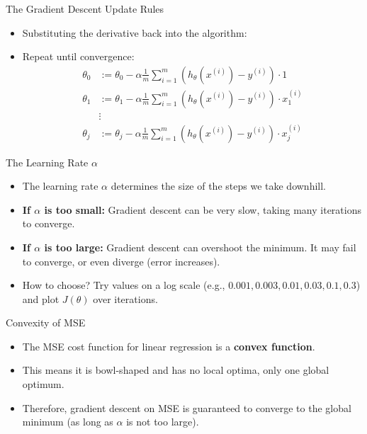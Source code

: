 \documentclass[aspectratio=169]{beamer}
\begin{document}
\begin{frame}{The Gradient Descent Update Rules}
\begin{itemize}
    \item Substituting the derivative back into the algorithm:
    \item Repeat until convergence:
        \begin{align*}
        \theta_0 &:= \theta_0 - \alpha \frac{1}{m} \sum_{i=1}^{m} (h_\theta(x^{(i)}) - y^{(i)}) \cdot 1 \\
        \theta_1 &:= \theta_1 - \alpha \frac{1}{m} \sum_{i=1}^{m} (h_\theta(x^{(i)}) - y^{(i)}) \cdot x_1^{(i)} \\
        &\vdots \\
        \theta_j &:= \theta_j - \alpha \frac{1}{m} \sum_{i=1}^{m} (h_\theta(x^{(i)}) - y^{(i)}) \cdot x_j^{(i)}
        \end{align*}
\end{itemize}
\end{frame}

\begin{frame}{The Learning Rate $\alpha$}
\begin{itemize}
    \item The learning rate $\alpha$ determines the size of the steps we take downhill.
    \item \textbf{If $\alpha$ is too small:} Gradient descent can be very slow, taking many iterations to converge.
    \item \textbf{If $\alpha$ is too large:} Gradient descent can overshoot the minimum. It may fail to converge, or even diverge (error increases).
    \item How to choose? Try values on a log scale (e.g., $0.001, 0.003, 0.01, 0.03, 0.1, 0.3$) and plot $J(\theta)$ over iterations.
\end{itemize}
\end{frame}

\begin{frame}{Convexity of MSE}
\begin{itemize}
    \item The MSE cost function for linear regression is a \textbf{convex function}.
    \item This means it is bowl-shaped and has no local optima, only one global optimum.
    \item Therefore, gradient descent on MSE is guaranteed to converge to the global minimum (as long as $\alpha$ is not too large).
\end{itemize}
\end{frame}
\end{document}
